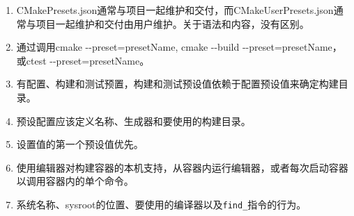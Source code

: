 

\begin{enumerate}
\item 
CMakePresets.json通常与项目一起维护和交付，而CMakeUserPresets.json通常与项目一起维护和交付由用户维护。关于语法和内容，没有区别。

\item
通过调用cmake -{}-preset=presetName, cmake -{}-build -{}-preset=presetName，或ctest -{}-preset=presetName。

\item 
有配置、构建和测试预置，构建和测试预设值依赖于配置预设值来确定构建目录。

\item 
预设配置应该定义名称、生成器和要使用的构建目录。

\item 
设置值的第一个预设值优先。

\item 
使用编辑器对构建容器的本机支持，从容器内运行编辑器，或者每次启动容器以调用容器内的单个命令。

\item 
系统名称、sysroot的位置、要使用的编译器以及\texttt{find\_}指令的行为。
\end{enumerate}